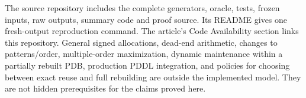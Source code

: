 \begin{sloppypar}
The source repository includes the complete generators, oracle, tests, frozen inputs, raw outputs, summary code and proof source. Its README gives one fresh-output reproduction command. The article's Code Availability section links this repository. General signed allocations, dead-end arithmetic, changes to patterns/order, multiple-order maximization, dynamic maintenance within a partially rebuilt PDB, production PDDL integration, and policies for choosing between exact reuse and full rebuilding are outside the implemented model. They are not hidden prerequisites for the claims proved here.
\end{sloppypar}
